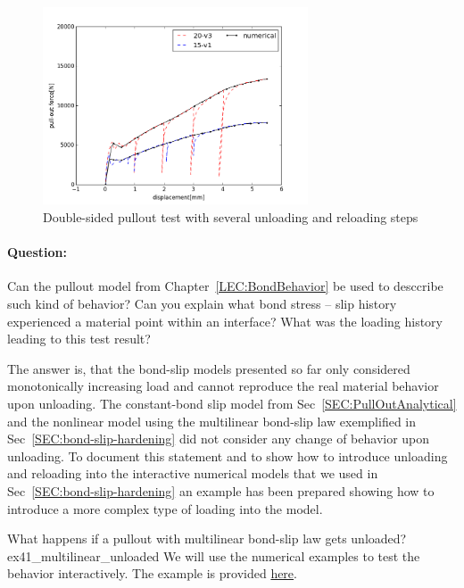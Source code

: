 \documentclass[main.tex]{subfiles}
\begin{document}
\begin{figure}[ht]
	\centering
  \includegraphics[width=0.7\textwidth]{fig/Lecture04/test_unloading.png}
	\caption{Double-sided pullout test with several unloading and reloading steps}
	\label{FIGUnloading}
\end{figure}

\paragraph{Question:}
Can the  pullout model from Chapter~\ref{LEC:BondBehavior} be used to desccribe such kind of behavior? Can you explain what bond stress -- slip history experienced a material point within an interface? What was the loading history leading to this test result?

The answer is, that the bond-slip models presented so far only considered monotonically increasing load and 
cannot reproduce the real material behavior upon unloading. 
The constant-bond slip model from Sec~\ref{SEC:PullOutAnalytical} and the nonlinear model using the multilinear bond-slip law exemplified in Sec~\ref{SEC:bond-slip-hardening} did not consider any change of behavior upon unloading. 
To document this statement and to show how to introduce unloading and reloading into the interactive numerical 
models  that we used in Sec~\ref{SEC:bond-slip-hardening} an example has been prepared showing how to introduce a more complex type of loading into the model.  

\begin{bmcsex}{What happens if a pullout with multilinear bond-slip law gets unloaded?}{ex41_multilinear_unloaded}
We will use the numerical examples to test the behavior interactively.
The example is provided \href{https://wiki.imb.rwth-aachen.de/do/view/IMB/Teaching/TeachExampleObj0010}{here}.
\end{bmcsex}
\end{document}
